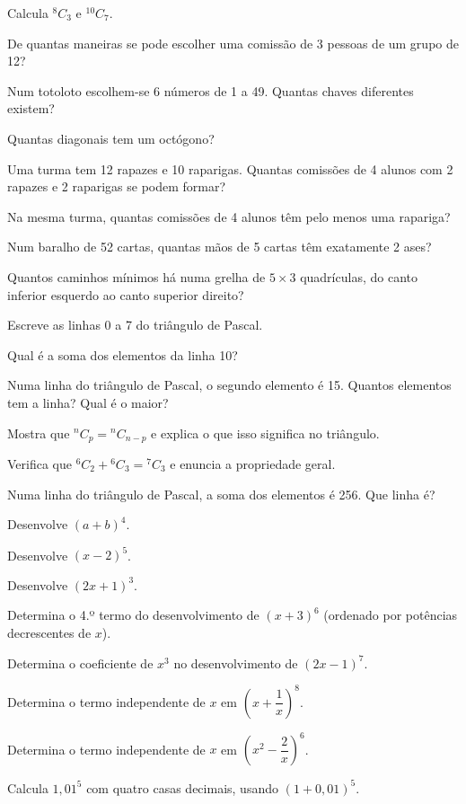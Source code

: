 \documentclass[12pt]{article}
\begin{document}
\begin{exercicios}
  \item Calcula $^8C_3$ e $^{10}C_{7}$.
  \item De quantas maneiras se pode escolher uma comissão de 3 pessoas de um grupo de 12?
  \item Num totoloto escolhem-se 6 números de 1 a 49. Quantas chaves diferentes existem?
  \item Quantas diagonais tem um octógono?
  \item Uma turma tem 12 rapazes e 10 raparigas. Quantas comissões de 4 alunos com 2 rapazes e 2 raparigas se podem formar?
  \item Na mesma turma, quantas comissões de 4 alunos têm pelo menos uma rapariga?
  \item Num baralho de 52 cartas, quantas mãos de 5 cartas têm exatamente 2 ases?
  \item Quantos caminhos mínimos há numa grelha de $5 \times 3$ quadrículas, do canto inferior esquerdo ao canto superior direito?
\end{exercicios}

\begin{exercicios}
  \item Escreve as linhas 0 a 7 do triângulo de Pascal.
  \item Qual é a soma dos elementos da linha 10?
  \item Numa linha do triângulo de Pascal, o segundo elemento é 15. Quantos elementos tem a linha? Qual é o maior?
  \item Mostra que $^nC_p = {}^nC_{n-p}$ e explica o que isso significa no triângulo.
  \item Verifica que $^6C_2 + {}^6C_3 = {}^7C_3$ e enuncia a propriedade geral.
  \item Numa linha do triângulo de Pascal, a soma dos elementos é 256. Que linha é?
\end{exercicios}

\begin{exercicios}
  \item Desenvolve $(a + b)^4$.
  \item Desenvolve $(x - 2)^5$.
  \item Desenvolve $(2x + 1)^3$.
  \item Determina o 4.º termo do desenvolvimento de $(x + 3)^6$ (ordenado por potências decrescentes de $x$).
  \item Determina o coeficiente de $x^3$ no desenvolvimento de $(2x - 1)^7$.
  \item Determina o termo independente de $x$ em $\left(x + \dfrac{1}{x}\right)^{8}$.
  \item Determina o termo independente de $x$ em $\left(x^2 - \dfrac{2}{x}\right)^{6}$.
  \item Calcula $1{,}01^5$ com quatro casas decimais, usando $(1 + 0{,}01)^5$.
\end{exercicios}
\end{document}
